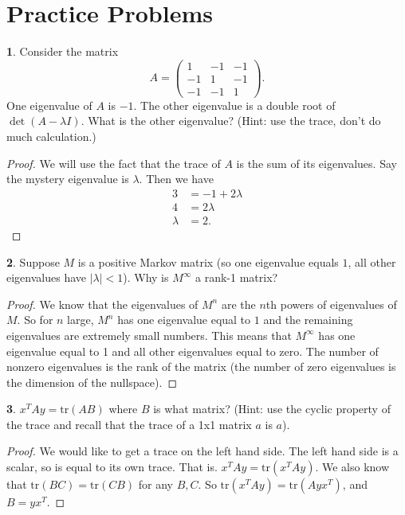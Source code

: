 \documentclass{article}
\theoremstyle{definition}
\newtheorem{prob}{}
\def\tr{\text{tr}}
\begin{document}
\section*{Practice Problems}
\begin{prob}
	Consider the matrix
	\[A= \begin{pmatrix}
		1 & -1 & -1\\-1&1&-1\\-1&-1&1
	\end{pmatrix}.\]
One eigenvalue of $A$ is $-1$. The other eigenvalue is a double root of $\det(A-\lambda I)$. What is the other eigenvalue? (Hint: use the trace, don't do much calculation.)
\end{prob}

\begin{proof}
	We will use the fact that the trace of $A$ is the sum of its eigenvalues. Say the mystery eigenvalue is $\lambda$. Then we have
	\begin{align*}
		3&= -1 + 2 \lambda\\
		4&= 2 \lambda\\
		\lambda&=2.
	\end{align*}
\end{proof}


\begin{prob}
Suppose $M$ is a positive Markov matrix (so one eigenvalue equals $1$, all other eigenvalues have $|\lambda|<1$).  Why is $M^\infty$ a rank-1 matrix?
\end{prob}
\begin{proof}
	We know that the eigenvalues of $M^n$ are the $n$th powers of eigenvalues of $M$. So for $n$ large, $M^n$ has one eigenvalue equal to $1$ and the remaining eigenvalues are extremely small numbers. This means that $M^\infty$ has one eigenvalue equal to 1 and all other eigenvalues equal to zero. The number of nonzero eigenvalues is the rank of the matrix (the number of zero eigenvalues is the dimension of the nullspace).
\end{proof}

\begin{prob}
	$x^T A y = \text{tr}(A B)$ where $B$ is what matrix?   (Hint: use the cyclic property of the trace and recall that the trace of a 1x1 matrix $a$ is $a$).
\end{prob}

\begin{proof}
	We would like to get a trace on the left hand side. The left hand side is a scalar, so is equal to its own trace. That is. $x^T A y=\text{tr}(x^T A y)$. We also know that $\tr(BC)=\tr(CB)$ for any $B, C$. So $\tr(x^T A y)= \tr(Ay x^T)$, and $B=y x^T$.
\end{proof}
\end{document}
